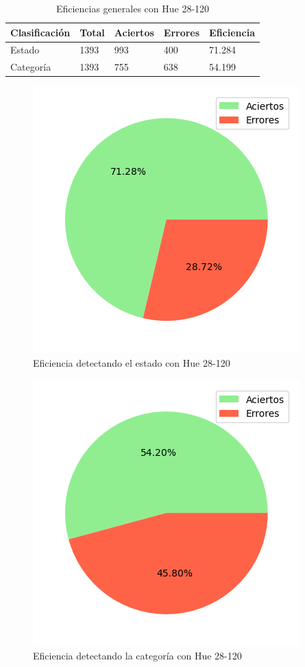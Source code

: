 \begin{table}[H]
\centering
\begin{tabular}{|l|l|l|l|l|}
\hline 
\textbf{Clasificación} & \textbf{Total} & \textbf{Aciertos} & \textbf{Errores} & \textbf{Eficiencia} \\
\hline
Estado & 1393 & 993 & 400 & 71.284 \\
\hline 
Categoría & 1393 & 755 & 638 & 54.199 \\
\hline 
\end{tabular}
\caption{Eficiencias generales con Hue 28-120}
\label{table:efficiency_general_28_120}
\end{table}

\captionsetup[figure]{skip=-10pt}

\begin{figure}[H]
\centering
\includegraphics[scale=0.6]{images/result_global_state_28_120.png}
\caption{Eficiencia detectando el estado con Hue 28-120}
\label{img:efficiency_state_28_120}
\end{figure}

\begin{figure}[H]
\centering
\includegraphics[scale=0.6]{images/result_global_class_28_120.png}
\caption{Eficiencia detectando la categoría con Hue 28-120}
\label{img:efficiency_category_28_120}
\end{figure}

